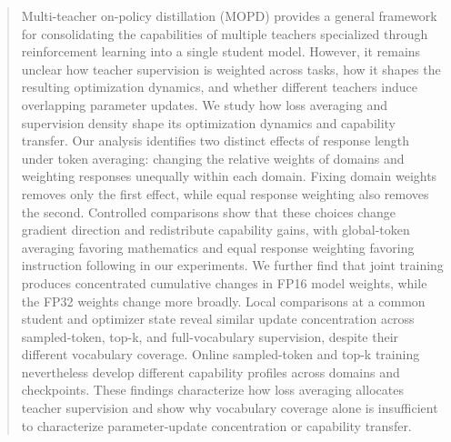 \begin{abstract}

Multi-teacher on-policy distillation (MOPD) provides a general framework for consolidating the capabilities of multiple teachers specialized through reinforcement learning into a single student model. However, it remains unclear how teacher supervision is weighted across tasks, how it shapes the resulting optimization dynamics, and whether different teachers induce overlapping parameter updates. We study how loss averaging and supervision density shape its optimization dynamics and capability transfer. Our analysis identifies two distinct effects of response length under token averaging: changing the relative weights of domains and weighting responses unequally within each domain. Fixing domain weights removes only the first effect, while equal response weighting also removes the second. Controlled comparisons show that these choices change gradient direction and redistribute capability gains, with global-token averaging favoring mathematics and equal response weighting favoring instruction following in our experiments. We further find that joint training produces concentrated cumulative changes in FP16 model weights, while the FP32 weights change more broadly. Local comparisons at a common student and optimizer state reveal similar update concentration across sampled-token, top-k, and full-vocabulary supervision, despite their different vocabulary coverage. Online sampled-token and top-k training nevertheless develop different capability profiles across domains and checkpoints. These findings characterize how loss averaging allocates teacher supervision and show why vocabulary coverage alone is insufficient to characterize parameter-update concentration or capability transfer.
\end{abstract}
